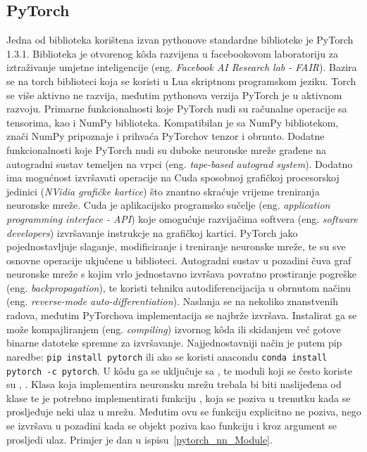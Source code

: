 \subsection{PyTorch}
Jedna od biblioteka korištena izvan pythonove standardne biblioteke je PyTorch 1.3.1. Biblioteka je otvorenog k\^oda razvijena u facebookovom laboratoriju za iztraživanje umjetne inteligencije  (eng. \textit{Facebook AI Research lab - FAIR}). Bazira se na torch biblioteci koja se koristi u Lua skriptnom programskom jeziku. Torch se više aktivno ne razvija, međutim pythonova verzija PyTorch je u aktivnom razvoju. Primarne funkcionalnosti koje PyTorch nudi su računalne operacije sa tensorima, kao i NumPy biblioteka. Kompatibilan je sa NumPy bibliotekom, znači NumPy pripoznaje i prihvaća PyTorchov tenzor i obrnuto. Dodatne funkcionalnosti koje PyTorch nudi su duboke neuronske mreže građene na autogradni sustav temeljen na vrpci (eng. \textit{tape-based autograd system}). Dodatno ima mogućnost izvršavati operacije na Cuda sposobnoj grafičkoj procesorskoj jedinici (\emph{NVidia grafičke kartice}) što znantno skraćuje vrijeme treniranja neuronske mreže. Cuda je aplikacijsko programsko sučelje (eng. \textit{application programming interface - API}) koje omogućuje razvijačima softvera (eng. \textit{software developers}) izvršavanje instrukcje na grafičkoj kartici. PyTorch jako pojednostavljuje slaganje, modificiranje i treniranje neuronske mreže, te su sve osnovne operacije ukjučene u biblioteci. Autogradni sustav u pozadini čuva graf neuronske mreže s kojim vrlo jednostavno izvršava povratno prostiranje pogreške (eng. \textit{backpropagation}), te koristi tehniku autodiferencijacija u obrnutom načinu (eng. \textit{reverse-mode auto-differentiation}). Naslanja se na nekoliko znanstvenih radova, međutim PyTorchova implementacija se najbrže izvršava. Instalirat ga se može kompajliranjem (eng. \textit{compiling}) izvornog k\^oda ili skidanjem već gotove binarne datoteke spremne za izvršavanje. Najjednostavniji način je putem pip naredbe: \lstinline$pip install pytorch$ ili ako se koristi anacondu \lstinline$conda install pytorch -c pytorch$. U k\^odu ga se uključuje sa , te moduli koji se često koriste su , . Klasa koja implementira neuronsku mrežu trebala bi biti naslijeđena od klase  te je potrebno implementirati funkciju , koja se poziva u trenutku kada se prosljeđuje neki ulaz u mrežu. Međutim ovu se funkciju explicitno ne poziva, nego se izvršava u pozadini kada se objekt poziva kao funkciju i kroz argument se prosljedi ulaz. Primjer je dan u ispisu~\ref{pytorch_nn_Module}.
{}

